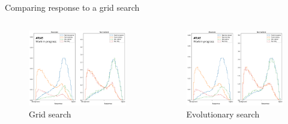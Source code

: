 \begin{frame}{Comparing response to a grid search}
    \begin{columns}
        \begin{column}{0.5\textwidth}
            \begin{figure}
                \centering
                \includegraphics[width = \textwidth]{grid_response.png}
                \caption{Grid search}
            \end{figure}
        \end{column}
        \begin{column}{0.5\textwidth}
            \begin{figure}
                \centering
                \includegraphics[width = \textwidth]{evo_response.png}
                \caption{Evolutionary search}
            \end{figure}
        \end{column}
    \end{columns}
\end{frame}